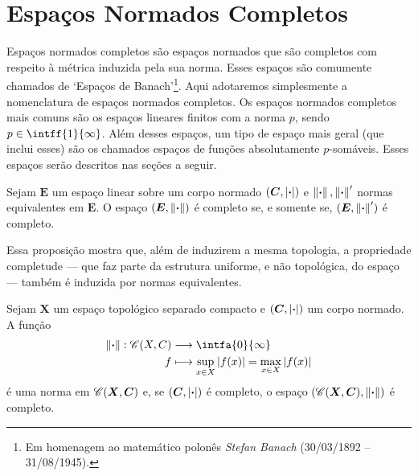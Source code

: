 \section{Espaços Normados Completos}

Espaços normados completos são espaços normados que são completos com respeito à métrica induzida pela sua norma. Esses espaços são comumente chamados de `Espaços de Banach'\footnote{Em homenagem ao matemático polonês \emph{Stefan Banach} (30/03/1892 -- 31/08/1945).}. Aqui adotaremos simplesmente a nomenclatura de espaços normados completos. Os espaços normados completos mais comuns são os espaços lineares finitos com a norma $p$, sendo $p \in \intff{1}{\infty}$. Além desses espaços, um tipo de espaço mais geral (que inclui esses) são os chamados espaços de funções absolutamente $p$-somáveis. Esses espaços serão descritos nas seções a seguir.


\begin{prop}
Sejam $\bm E$ um espaço linear sobre um corpo normado $(\bm C,\left\vert{\bm{\cdot}}\right\vert)$ e $\left\Vert{\bm{\cdot}}\right\Vert, \left\Vert{\bm{\cdot}}\right\Vert'$ normas equivalentes em $\bm E$. O espaço $(\bm E,\left\Vert{\bm{\cdot}}\right\Vert)$ é completo se, e somente se, $(\bm E,\left\Vert{\bm{\cdot}}\right\Vert')$ é completo.
\end{prop}

Essa proposição mostra que, além de induzirem a mesma topologia, a propriedade completude --- que faz parte da estrutura uniforme, e não topológica, do espaço --- também é induzida por normas equivalentes.

\begin{prop}
Sejam $\bm X$ um espaço topológico separado compacto e $(\bm C,\left\vert{\bm{\cdot}}\right\vert)$ um corpo normado. A função
	\begin{align*}
	\func{\nor{\var}}{\cont(X,C)}{\intfa{0}{\infty}}{f}{\sup_{x \in X} \abs{f(x)} = \max_{x \in X} \abs{f(x)}}
	\end{align*}
é uma norma em $\mathscr{C}(\bm X,\bm C)$ e, se $(\bm C,\left\vert{\bm{\cdot}}\right\vert)$ é completo, o espaço $(\mathscr{C}(\bm X,\bm C),\left\Vert{\bm{\cdot}}\right\Vert)$ é completo.
\end{prop}



